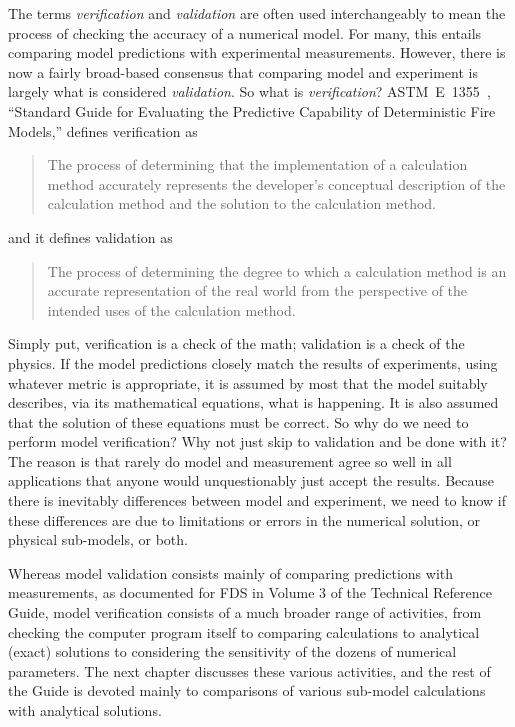 \documentclass[11pt]{book}
\begin{document}
The terms {\em verification} and {\em validation} are often used interchangeably to mean the process of checking the
accuracy of a numerical model. For many, this entails comparing model predictions with experimental measurements. However,
there is now a fairly broad-based consensus that comparing model and experiment is largely what is considered {\em validation}. So what is
{\em verification}? ASTM~E~1355~\cite{ASTM:E1355}, ``Standard Guide for
Evaluating the Predictive Capability of Deterministic Fire Models,'' defines verification as
\begin{quote}
The process of determining that the implementation of a calculation method accurately
represents the developer's conceptual description of the calculation method and the solution to the calculation method.
\end{quote}
and it defines validation as
\begin{quote}
The process of determining the degree to which a calculation method is an accurate representation of the real world
from the perspective of the intended uses of the calculation method.
\end{quote}
Simply put, verification is a check of the math; validation is a check of the physics. If the model predictions closely match
the results of experiments, using whatever metric is appropriate, it is assumed by most that the model suitably describes, via
its mathematical equations, what is happening. It is also assumed that the solution of these equations must be correct. So why do
we need to perform model verification? Why not just skip to validation and be done with it? The reason is that rarely do model and
measurement agree so well in all applications that anyone would unquestionably just accept the results. Because there is
inevitably differences between model and experiment, we need to know if these differences are due to limitations or errors in
the numerical solution, or physical sub-models, or both.

Whereas model validation consists mainly of comparing predictions with measurements, as documented for FDS in Volume 3 of the
Technical Reference Guide, model verification consists of a much broader range of activities, from checking the computer program
itself to comparing calculations to analytical (exact) solutions to considering the sensitivity of the dozens of numerical
parameters. The next chapter discusses these various activities, and the rest of the Guide is devoted mainly to comparisons of
various sub-model calculations with analytical solutions.
\end{document}
